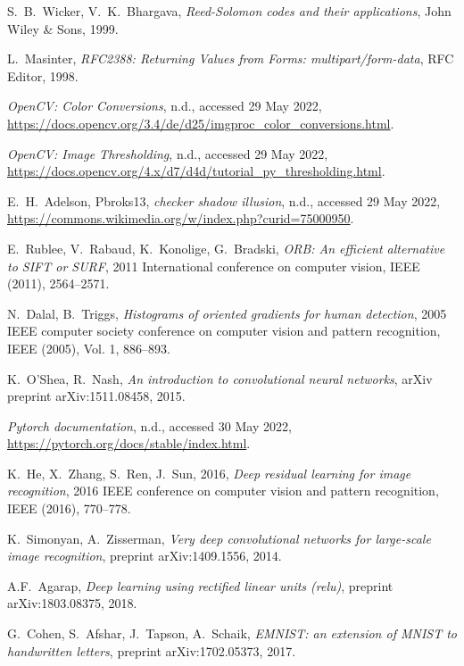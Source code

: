 \documentclass[11pt, a4paper]{report}
\begin{document}
\begin{thebibliography}{99}	

S.~B.~Wicker, V.~K.~Bhargava,
\emph{Reed-Solomon codes and their applications},
John Wiley \& Sons, 1999.

L.~Masinter, 
\emph{RFC2388: Returning Values from Forms: multipart/form-data},
RFC Editor, 1998.

\emph{OpenCV: Color Conversions}, n.d., accessed 29 May 2022,  \url{https://docs.opencv.org/3.4/de/d25/imgproc\_color\_conversions.html}.

\emph{OpenCV: Image Thresholding}, n.d., accessed 29 May 2022,
\url{https://docs.opencv.org/4.x/d7/d4d/tutorial\_py\_thresholding.html}.

E.~H.~Adelson, Pbroks13, \emph{checker shadow illusion}, n.d., accessed 29 May 2022, \url{https://commons.wikimedia.org/w/index.php?curid=75000950}.

E.~Rublee, V.~Rabaud, K.~Konolige, G.~Bradski,
\emph{ORB: An efficient alternative to SIFT or SURF},
	2011 International conference on computer vision, IEEE (2011),
	2564--2571.

N.~Dalal, B.~Triggs,
\emph{Histograms of oriented gradients for human detection},
2005 IEEE computer society conference on computer vision and pattern recognition, IEEE (2005), Vol. 1, 886--893.

K.~O'Shea, R.~Nash,
\emph{An introduction to convolutional neural networks}, arXiv preprint
arXiv:1511.08458, 2015.

\emph{Pytorch documentation}, n.d., accessed 30 May 2022,
\url{https://pytorch.org/docs/stable/index.html}.

K.~He, X.~Zhang, S.~Ren, J.~Sun, 2016,
\emph{Deep residual learning for image recognition},
2016 IEEE conference on computer vision and pattern recognition, IEEE (2016), 770--778.

K.~Simonyan, A.~Zisserman,
\emph{Very deep convolutional networks for large-scale image recognition}, preprint arXiv:1409.1556, 2014.

A.F.~Agarap,
\emph{Deep learning using rectified linear units (relu)}, preprint arXiv:1803.08375, 2018.

G.~Cohen, S.~Afshar, J.~Tapson, A.~Schaik,
\emph{EMNIST: an extension of MNIST to handwritten letters}, preprint arXiv:1702.05373, 2017.


\end{thebibliography}
\end{document}
